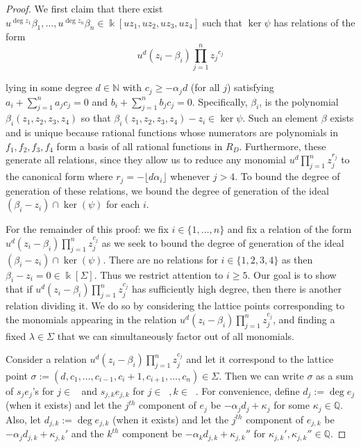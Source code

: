 \documentclass{amsart}
\theoremstyle{plain}
\theoremstyle{definition}
\theoremstyle{remark}
\numberwithin{equation}{section}
\newcommand\bq{{\mathbb Q}}
\newcommand\bk{{\Bbbk}}
\newcommand\bida{a}
\newcommand\bidb{b}
\DeclareMathOperator{\Te}{T_=}
\DeclareMathOperator{\Tp}{T_+}
\DeclareMathOperator{\Tm}{T_-}
\begin{document}
\begin{proof}
We first claim that there exist $u^{\deg z_1}\beta_1, \ldots, u^{\deg z_n} \beta_n\in \bk[uz_1, uz_2, uz_3, uz_4]$
such that $\ker \psi$ has relations of the form
\[
	u^d(z_i - \beta_i)\prod_{j=1}^n {z_j}^{c_{j}}
\]

\noindent
lying in some degree $d \in \mathbb{N}$
with $c_j \ge -\alpha_j d$ (for all $j$) satisfying $\bida_i + \sum_{j = 1}
^n \bida_j c_j = 0$ and $\bidb_i + \sum_{j=1}^n \bidb_j c_j = 0$.
Specifically, $\beta_i$,
is the polynomial $\beta_i(z_1,z_2,z_3,z_4)$ so that
$\beta_i(z_1,z_2,z_3,z_4) - z_i \in \ker \psi$. Such an element
$\beta$ exists and is unique because rational functions
whose numerators are polynomials in $f_1, f_2, f_3, f_4$ form a basis
of all rational functions in $R_D$. Furthermore, these
generate all relations, since they allow us to reduce any monomial $u^d\prod_{j =
1}^n z_j^{r_j}$ to the canonical form where $r_j = -\lfloor d \alpha_i
\rfloor$ whenever $j > 4$. To bound the degree of generation of these relations,
we bound the degree of generation of the ideal $(\beta_i - z_i) \cap
\ker(\psi)$ for each $i$.

For the remainder of this proof: we fix $i \in \{1, \ldots,
n\}$ and fix a relation of the form $u^d (z_i - \beta_i) \prod_{j =
1}^n z_j^{c_j}$ as we seek to bound the degree of generation of the
ideal $(\beta_i - z_i) \cap \ker(\psi)$. There are no
relations for $i\in \{1, 2, 3, 4\}$ as then $\beta_i - z_i = 0 \in
\bk[\Sigma]$. Thus we restrict attention to $i \ge 5$. Our goal is
to show that if $u^d(z_i - \beta_i)\prod_{j=1}^n z_j^{c_j}$ has
sufficiently high degree, then there is another relation dividing
it. We do so by considering the lattice points corresponding to the
monomials appearing in the relation $u^d(z_i - \beta_i)\prod_{j=1}^
n z_j^{c_j}$, and finding a fixed $\lambda\in \Sigma$ that we can
simultaneously factor out of all monomials.


Consider a relation $u^d(z_i - \beta_i)\prod_{j=1}^n z_j^{c_j}$ and
let it correspond to the lattice point $\sigma := (d, c_1, \ldots,
c_{i-1}, c_{i}+1, c_{i+1}, \ldots, c_n) \in \Sigma$.
Then we can write $\sigma$ as a sum of $s_j e_j$'s for $j\in
\Te$ and $s_{j,k}e_{j,k}$ for $j\in \Tp, k\in \Tm$.  
For convenience, define $d_j := \deg e_j$ (when it exists) and let the $j^{th}$
component of $e_j$ be $-\alpha_j d_j + \kappa_j$ for some $\kappa_j \in \bq$. Also, let $d_{j,k} := \deg e_{j,k}$ (when it exists) and let the $j^{th}$ component of $e_{j,k}$ be $-\alpha_j d_{j,k} + \kappa_{j,k}'$ and the $k^{th}$
component be $-\alpha_k d_{j,k} + \kappa_{j,k}''$ for $\kappa_{j,k}', \kappa_{j,k}'' \in \bq$.


\end{proof}
\end{document}
